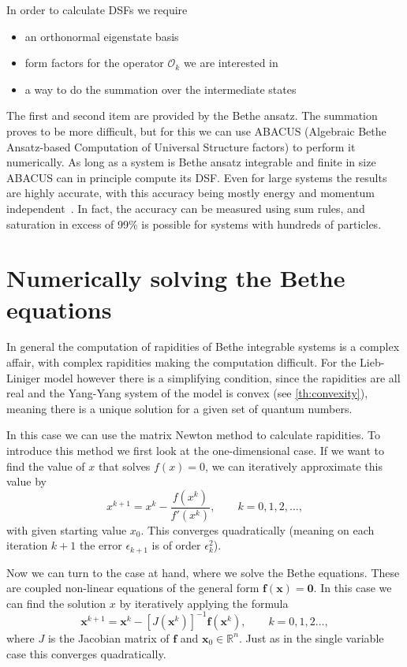 \documentclass[11pt, a4paper]{report} %
\begin{document}
In order to calculate DSFs we require
\begin{itemize}
  \item an orthonormal eigenstate basis
  \item form factors for the operator $\mathcal{O}_k$ we are interested in
  \item a way to do the summation over the intermediate states
\end{itemize}
The first and second item are provided by the Bethe ansatz.
The summation proves to be more difficult, but for this we can use ABACUS (Algebraic Bethe Ansatz-based Computation of Universal Structure factors) to perform it numerically.
As long as a system is Bethe ansatz integrable and finite in size ABACUS can in principle compute its DSF.
Even for large systems the results are highly accurate, with this accuracy being mostly energy and momentum independent~\cite{Caux2009}.
In fact, the accuracy can be measured using sum rules, and saturation in excess of 99\% is possible for systems with hundreds of particles.


\section{Numerically solving the Bethe equations}\label{sec:numer-solv-bethe}

In general the computation of rapidities of Bethe integrable systems is a complex affair, with complex rapidities making the computation difficult.
For the Lieb-Liniger model however there is a simplifying condition, since the rapidities are all real and the Yang-Yang system of the model is convex (see \cref{th:convexity}), meaning there is a unique solution for a given set of quantum numbers.

In this case we can use the matrix Newton method to calculate rapidities.
To introduce this method we first look at the one-dimensional case.
If we want to find the value of \(x\) that solves \(f(x)=0\), we can iteratively approximate this value by 
\begin{equation}
  x^{k+1} = x^k - \frac{f(x^k)}{f'(x^k)}, \qquad k = 0, 1, 2, \ldots,
\end{equation}
with given starting value \(x_0\).
This converges quadratically (meaning on each iteration \(k+1\) the error \(\epsilon_{k+1}\) is of order \(\epsilon_k^2\)).

Now we can turn to the case at hand, where we solve the Bethe equations.
These are coupled non-linear equations of the general form \(\mathbf{f(x)=0}\).
In this case we can find the solution \(x\) by iteratively applying the formula
\begin{equation}
  \mathbf{x}^{k+1} = \mathbf{x}^k - {[J(\mathbf{x}^k)]}^{-1}\mathbf{f}(\mathbf{x}^k), \qquad k=0,1,2\ldots,
\end{equation}
where \(J\) is the Jacobian matrix of \(\mathbf{f}\) and \(\mathbf{x}_0 \in \mathbb{R}^n\).
Just as in the single variable case this converges quadratically.
\end{document}
